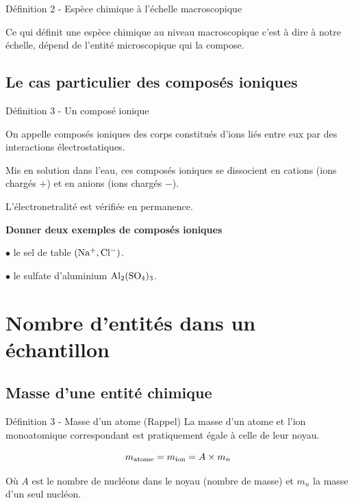 \documentclass[french, a4paper, 12pt, landscape, twocolumn]{article}
\begin{document}
\begin{definition}{Définition 2 - Espèce chimique à l'échelle macroscopique}

	Ce qui définit une espèce chimique au niveau macroscopique c'est à dire à notre échelle, dépend de l'entité microscopique qui la compose.
\end{definition}

\subsection{Le cas particulier des composés ioniques}

\begin{definition}{Définition 3 - Un composé ionique}
	\medskip

	On appelle composés ioniques des corps constitués d'ions liés entre eux par des interactions électrostatiques.\medskip

	Mis en solution dans l'eau, ces composés ioniques se dissocient en cations (ions chargés $+$) et en anions (ions chargés $-$).\medskip

	L'électronetralité est vérifiée en permanence.
\end{definition}

\noindent \textbf{Donner deux exemples de composés ioniques}\medskip

$\bullet$ le sel de table $(\rm Na^+, Cl^-)$.\medskip

$\bullet$ le sulfate d'aluminium $\rm Al_2(SO_4)_3$.


\section{Nombre d'entités dans un échantillon}

\subsection{Masse d'une entité chimique}

\begin{definition}{Définition 3  - Masse d'un atome (Rappel)}
	La masse d'un atome et l'ion monoatomique correspondant est pratiquement égale à celle de leur noyau. 

	\begin{equation}
		m_{\rm atome} = m_{\rm ion} = A\times m_{n}
	\end{equation}

	Où $A$ est le nombre de nucléons dans le noyau (nombre de masse) et $m_n$ la masse d'un seul nucléon.
\end{definition}
\end{document}
